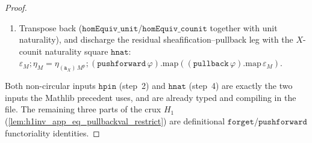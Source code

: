 \begin{proof}
\begin{enumerate}
      invisible from the composite \(\mathtt{homEquiv}\) and the reason the naive route is circular.
    \item Transpose back (\(\mathtt{homEquiv\_unit}\)/\(\mathtt{homEquiv\_counit}\) together with unit
      naturality), and discharge the residual sheafification--pullback leg with the \(X\)-counit
      naturality square
      \(\mathtt{hnat}\): \(\varepsilon_M \mathbin{;} \eta_M
      = \eta_{(\mathtt{a}_X)\,M^{\mathrm p}} \mathbin{;} (\mathtt{pushforward}\,\varphi).\mathrm{map}
      ((\mathtt{pullback}\,\varphi).\mathrm{map}\,\varepsilon_M)\).
  \end{enumerate}
  Both non-circular inputs \(\mathtt{hpin}\) (step~2) and \(\mathtt{hnat}\) (step~4) are exactly the two
  inputs the Mathlib precedent uses, and are already typed and compiling in the file. The remaining
  three parts of the crux \(H_1\) (\cref{lem:h1inv_app_eq_pullbackval_restrict}) are definitional
  \(\mathtt{forget}\)/\(\mathtt{pushforward}\) functoriality identities.
\end{proof}

